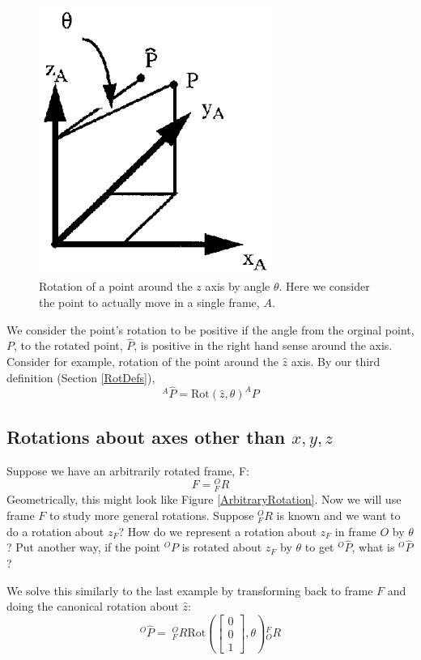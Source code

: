 \begin{figure}
\includegraphics[width=3.0in]{figs02/00324.eps}
\caption{Rotation of a point around the $z$ axis by angle $\theta$.   Here we consider the point to actually move in a single frame, $A$. }\label{RotationOfAPoint}
\end{figure}

We consider the point's rotation to be positive if the angle from the orginal point, $P$, to the rotated point, $\hat{P}$, is positive in the right hand sense around the axis.  Consider for example, rotation of the point around the $\hat{z}$ axis.    By our third definition (Section \ref{RotDefs}),
\[
^A\hat{P} = \mathrm{Rot}(\hat{z},\theta)^AP
\]




\subsection{Rotations about axes other than $x,y,z$}
Suppose we have an arbitrarily rotated frame, F:
\[
F = {}^O_FR
\]
Geometrically, this might look like Figure \ref{ArbitraryRotation}.   Now we will use frame $F$ to study more general rotations.   Suppose $ ^O_FR$ is known and we want to do a rotation about $z_F$?  How do we represent a rotation about $z_F$ in frame $O$ by $\theta$?   Put another way, if the point $^OP$ is rotated about $z_F$ by $\theta$ to get $^O\hat{P}$, what is $^O\hat{P}$?

We solve this similarly to the last example by transforming back to frame $F$ and doing the canonical rotation about $\hat{z}$:
\[
^O\hat{P} = \;{}^O_FR \mathrm{Rot} \left (
\begin{bmatrix}  0 \\ 0 \\ 1 \end{bmatrix} , \theta \right )
 {}^F_OR
\]

